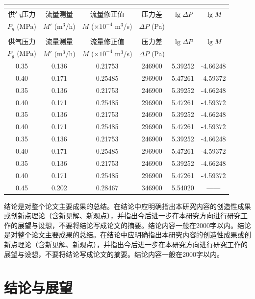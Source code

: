 \documentclass[a4paper, twoside, openany]{NCEPUMaster}
\begin{document}
\begin{longtable}{C{0.15} C{0.15} C{0.25} C{0.15} C{0.15} C{0.15}}
\label{tab:permeability} \\ %

\toprule[1.5pt]
供气压力 & 流量测量 & 流量修正值 & 压力差 & $\lg \Delta P$ & $\lg M$ \\ 
$P_g$ (MPa) & $M'$ (m$^3$/h) & $M$ ($\times10^{-4}$ m$^3$/s) & $\Delta P$ (Pa) & & \\  %
\midrule[1pt]
\endfirsthead

 \\ %
\toprule[1.5pt]
供气压力 & 流量测量 & 流量修正值 & 压力差 & $\lg \Delta P$ & $\lg M$ \\ 
$P_g$ (MPa) & $M'$ (m$^3$/h) & $M$ ($\times10^{-4}$ m$^3$/s) & $\Delta P$ (Pa) & & \\ %
\midrule[1pt]
\endhead

\bottomrule[1.5pt]
\endfoot

0.35 & 0.136 & 0.21753 & 246900 & 5.39252 & -4.66248 \\  
0.40 & 0.171 & 0.25485 & 296900 & 5.47261 & -4.59372 \\
0.35 & 0.136 & 0.21753 & 246900 & 5.39252 & -4.66248 \\
0.40 & 0.171 & 0.25485 & 296900 & 5.47261 & -4.59372 \\
0.35 & 0.136 & 0.21753 & 246900 & 5.39252 & -4.66248 \\
0.40 & 0.171 & 0.25485 & 296900 & 5.47261 & -4.59372 \\
0.35 & 0.136 & 0.21753 & 246900 & 5.39252 & -4.66248 \\
0.40 & 0.171 & 0.25485 & 296900 & 5.47261 & -4.59372 \\
0.35 & 0.136 & 0.21753 & 246900 & 5.39252 & -4.66248 \\
0.40 & 0.171 & 0.25485 & 296900 & 5.47261 & -4.59372 \\
0.45 & 0.202 & 0.28467 & 346900 & 5.54020 & —— 
\end{longtable}

结论是对整个论文主要成果的总结。在结论中应明确指出本研究内容的创造性成果或创新点理论（含新见解、新观点），并指出今后进一步在本研究方向进行研究工作的展望与设想，不要将结论写成论文的摘要。结论内容一般在2000字以内。结论是对整个论文主要成果的总结。在结论中应明确指出本研究内容的创造性成果或创新点理论（含新见解、新观点），并指出今后进一步在本研究方向进行研究工作的展望与设想，不要将结论写成论文的摘要。结论内容一般在2000字以内。\chapter{结论与展望}
\end{document}
